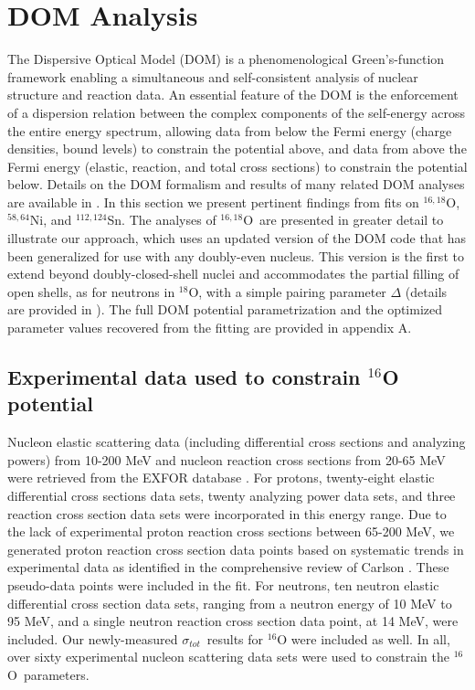 \documentclass[twocolumn,secnumarabic,amssymb, nobibnotes, aps, prl,
superscriptaddress, nobalancelastpage]{revtex4}
\newcommand{\tot}{\ensuremath{\sigma_{tot}}}
\newcommand{\oSix}{\ensuremath{^{16}}O}
\newcommand{\oEight}{\ensuremath{^{18}}O}
\newcommand{\oSixEight}{\ensuremath{^{16,18}}O}
\newcommand{\niEightFour}{\ensuremath{^{58,64}}N\lowercase{i}}
\newcommand{\snTwelveFour}{\ensuremath{^{112,124}}S\lowercase{n}}
\begin{document}
\section{DOM Analysis}

The Dispersive Optical Model (DOM) is a phenomenological Green's-function
framework enabling a simultaneous and self-consistent analysis of nuclear
structure and reaction
data. An essential feature of the DOM is the enforcement of a dispersion
relation between the complex components of the self-energy across the entire
energy spectrum, allowing data from below the Fermi energy (charge densities,
bound levels) to constrain the potential above, and data from above the Fermi
energy (elastic, reaction, and total cross sections) to constrain the potential
below. Details on the DOM formalism and results of many related DOM analyses are available in
\cite{Mahaux1991, Dickhoff2018, PruittPhDThesis, AtkinsonPhDThesis,
MahzoonPhDThesis}. In this section we present pertinent findings from fits on \oSixEight,
\niEightFour, and \snTwelveFour. The analyses of \oSixEight\ are presented in
greater detail to illustrate our approach, which uses an updated version
of the DOM code that has been generalized for use with any doubly-even nucleus.
This version is the first to extend beyond doubly-closed-shell nuclei and
accommodates the partial filling
of open shells, as for neutrons in \oEight, with a simple pairing parameter
$\Delta$ (details are provided in \cite{PruittPhDThesis}).
The full DOM potential parametrization and the optimized parameter values
recovered from the fitting are provided in appendix A.

\subsection{Experimental data used to constrain $^{16}$O potential}

Nucleon elastic scattering data (including differential cross sections and analyzing
powers) from 10-200 MeV and nucleon reaction cross sections from 20-65 MeV
were retrieved from the EXFOR database \cite{EXFORDatabase}.
For protons, twenty-eight elastic differential cross
sections data sets, twenty analyzing power data sets,
and three reaction cross section data sets were
incorporated in this energy range. Due to the lack of experimental proton
reaction cross sections between 65-200 MeV, we generated proton reaction cross
section data points based on systematic trends in experimental data 
as identified in the comprehensive review of Carlson \cite{Carlson1996}.
These pseudo-data points were included in the fit. For
neutrons, ten neutron elastic differential cross section
data sets, ranging from a neutron energy of 10 MeV to 95 MeV, and a single
neutron reaction cross section data point, at 14 MeV, were included. 
Our newly-measured \tot\ results for $^{16}$O were included as well. In all,
over sixty experimental nucleon scattering data sets were used to constrain the
\oSix\ parameters.
\end{document}
